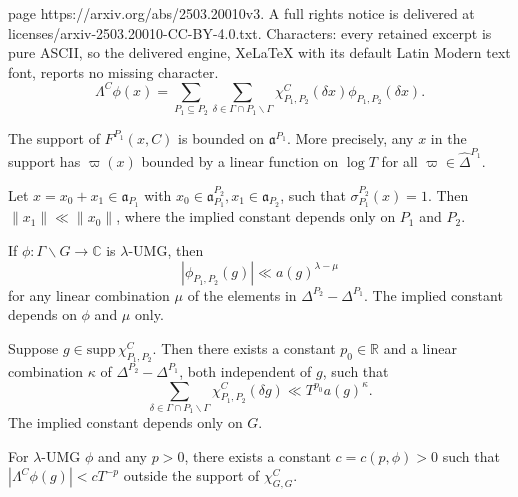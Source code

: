 \documentclass[10pt,a4paper]{amsart}
\def\R{\mathbb{R}}
\newcommand{\C}{\mathbb{C}}
\newcommand{\ga}{\mathfrak{a}}
\begin{document}
page https://arxiv.org/abs/2503.20010v3. A full rights notice is delivered at licenses/arxiv-2503.20010-CC-BY-4.0.txt. Characters: every retained excerpt is pure ASCII, so the delivered engine, XeLaTeX with its default Latin Modern text font, reports no missing character.
\begin{equation}\label{eq:arthur_t_defn2}
\Lambda^C\phi(x) = \sum_{P_1 \subseteq P_2} \sum_{\delta \in \Gamma \cap P_1 \backslash \Gamma} \chi_{P_1,P_2}^C(\delta x)\phi_{P_1,P_2}(\delta x).
\end{equation}

\begin{lemma} \label{lemma:umg1}
The support of $F^{P_1}(x, C)$ is bounded on $\ga^{P_1}$. More precisely, any $x$ in the support has $\varpi(x)$ bounded by a linear function on $\log T$ for all $\varpi \in \widehat\Delta^{P_1}$.
\end{lemma}

\begin{lemma} \label{lemma:umg1'}
Let $x = x_0 + x_1 \in \ga_{P_1}$ with $x_0 \in \ga_{P_1}^{P_2}, x_1 \in \ga_{P_2}$, such that $\sigma_{P_1}^{P_2}(x) = 1$. Then $\|x_1\| \ll \|x_0\|$, where the implied constant depends only on $P_1$ and $P_2$.
\end{lemma}

\begin{lemma} \label{lemma:umg2}
If $\phi:\Gamma \backslash G \rightarrow \C$ is $\lambda$-UMG, then 
\begin{equation*}
|\phi_{P_1,P_2}(g)| \ll a(g)^{\lambda-\mu}
\end{equation*} for any linear combination $\mu$ of the elements in $\Delta^{P_2} - \Delta^{P_1}$. The implied constant depends on $\phi$ and $\mu$ only.
\end{lemma}

\begin{lemma} \label{lemma:umg3}
Suppose $g \in \mathrm{supp}\,\chi_{P_1,P_2}^C$. Then there exists a constant $p_0 \in \R$ and a linear combination $\kappa$ of $\Delta^{P_2} - \Delta^{P_1}$, both independent of $g$, such that
\begin{equation*}
\sum_{\delta \in \Gamma \cap P_1 \backslash \Gamma} \chi_{P_1,P_2}^C(\delta g) \ll T^{p_0} a(g)^\kappa.
\end{equation*}
The implied constant depends only on $G$.
\end{lemma}

\begin{theorem} \label{thm:truncate}
For $\lambda$-UMG $\phi$ and any $p > 0$, there exists a constant $c=c(p,\phi)>0$ such that $|\Lambda^C\phi(g)| < cT^{-p}$ outside the support of $\chi_{G,G}^C$.
\end{theorem}
\end{document}
